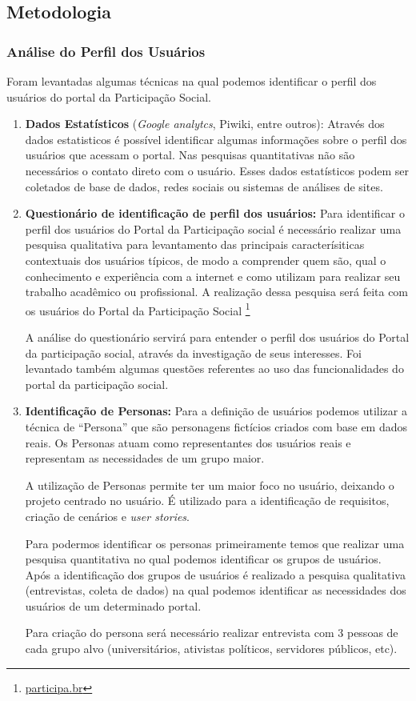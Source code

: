 \subsection{Metodologia}

\subsubsection{Análise do Perfil dos Usuários}

	Foram levantadas algumas técnicas na qual podemos identificar o perfil dos usuários do portal da Participação Social.
\begin{enumerate}
\item \textbf{Dados Estatísticos} (\textit{Google analytcs}, Piwiki, entre outros): Através dos dados estatisticos é possível identificar algumas informações sobre o perfil dos usuários que acessam o portal. Nas pesquisas quantitativas não são necessários o contato direto com o usuário. Esses dados estatísticos podem ser coletados de base de dados, redes sociais ou sistemas de análises de sites.

\item \textbf{Questionário de identificação de perfil dos usuários:} Para identificar o perfil dos usuários do Portal da Participação social é necessário realizar uma pesquisa qualitativa para levantamento das principais caracterísiticas contextuais dos usuários típicos, de modo a comprender quem são, qual o conhecimento e experiência com a internet e como utilizam para realizar seu trabalho acadêmico ou profissional. A realização dessa pesquisa será feita com os usuários do Portal da Participação Social \footnote{\url{participa.br}}

A análise do questionário servirá para entender o perfil dos usuários do Portal da participação social, através da investigação de seus interesses. Foi levantado também algumas questões referentes ao uso das funcionalidades do portal da participação social.


\item \textbf{Identificação de Personas:} Para a definição de usuários podemos utilizar a técnica de “Persona” que são personagens fictícios criados com base em dados reais. Os Personas atuam como representantes dos usuários reais e representam as necessidades de um grupo maior. 

	A utilização de Personas permite ter um maior foco no usuário, deixando o projeto centrado no usuário. É utilizado para a identificação de requisitos, criação de cenários e \textit{user stories}. 

	Para podermos identificar os personas primeiramente temos que realizar uma pesquisa quantitativa no qual podemos identificar os grupos de usuários. Após a identificação dos grupos de usuários é realizado a pesquisa qualitativa (entrevistas, coleta de dados) na qual podemos identificar as necessidades dos usuários de um determinado portal.

	Para criação do persona será necessário realizar entrevista com 3 pessoas de cada grupo alvo (universitários, ativistas políticos, servidores públicos, etc).

\end{enumerate}

